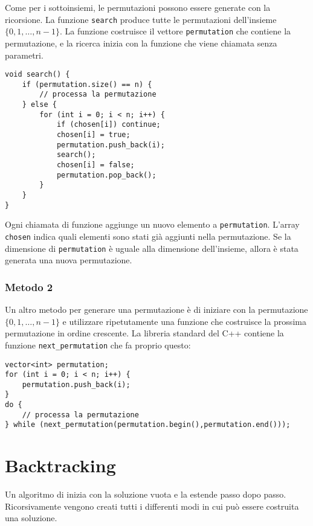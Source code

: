 Come per i sottoinsiemi, le permutazioni possono
essere generate con la ricorsione.
La funzione \texttt{search} produce tutte le 
permutazioni dell'insieme $\{0,1,\ldots,n-1\}$.
La funzione costruisce il vettore \texttt{permutation}
che contiene la permutazione,
e la ricerca inizia con la funzione che viene chiamata
senza parametri.

\begin{lstlisting}
void search() {
    if (permutation.size() == n) {
        // processa la permutazione
    } else {
        for (int i = 0; i < n; i++) {
            if (chosen[i]) continue;
            chosen[i] = true;
            permutation.push_back(i);
            search();
            chosen[i] = false;
            permutation.pop_back();
        }
    }
}
\end{lstlisting}

Ogni chiamata di funzione aggiunge un nuovo elemento
a \texttt{permutation}.
L'array \texttt{chosen} indica quali elementi sono stati già aggiunti nella permutazione.
Se la dimensione di \texttt{permutation} è uguale alla dimensione dell'insieme,
allora è stata generata una nuova permutazione.

\subsubsection{Metodo 2}


Un altro metodo per generare una permutazione
è di iniziare con la permutazione
$\{0,1,\ldots,n-1\}$ e utilizzare ripetutamente una funzione che costruisce
la prossima permutazione in ordine crescente.
La libreria standard del C++ contiene la funzione
\texttt{next\_permutation} che fa proprio questo:

\begin{lstlisting}
vector<int> permutation;
for (int i = 0; i < n; i++) {
    permutation.push_back(i);
}
do {
    // processa la permutazione
} while (next_permutation(permutation.begin(),permutation.end()));
\end{lstlisting}

\section{Backtracking}


Un algoritmo di  
inizia con la soluzione vuota e la estende
passo dopo passo.
Ricorsivamente vengono creati tutti 
i differenti modi in cui può essere
costruita una soluzione.

